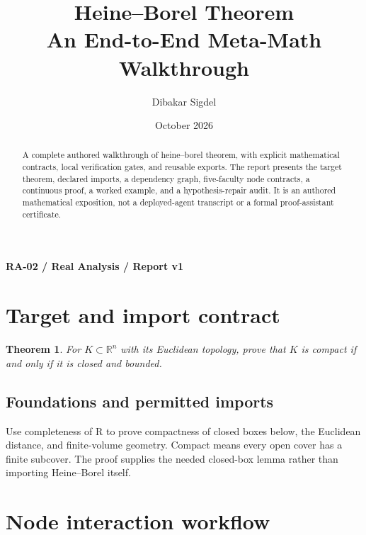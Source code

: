 \documentclass[preprint,12pt,aps,pra,showkeys,amsmath,amssymb,superscriptaddress,floatfix]{revtex4-2}
\newtheorem{theorem}{Theorem}[section]
\theoremstyle{definition}
\theoremstyle{remark}
\begin{document}
\title{Heine--Borel Theorem\\[4pt]\large An End-to-End Meta-Math Walkthrough}

\author{Dibakar Sigdel}


\date{October 2026}

\begin{abstract}

A complete authored walkthrough of heine--borel theorem, with explicit
mathematical contracts, local verification gates, and reusable exports.
The report presents the target theorem, declared imports, a dependency
graph, five-faculty node contracts, a continuous proof, a worked
example, and a hypothesis-repair audit. It is an authored mathematical
exposition, not a deployed-agent transcript or a formal proof-assistant
certificate.

\end{abstract}\maketitle\linespread{1.12}\selectfont

\noindent\textbf{RA-02 / Real Analysis / Report v1}

\section{Target and import contract}

\begin{theorem}

For \(K\subset\mathbb R^n\) with its Euclidean topology, prove that
\(K\) is compact if and only if it is closed and bounded.

\end{theorem}

\subsection{Foundations and permitted imports}

Use completeness of R to prove compactness of closed boxes below, the
Euclidean distance, and finite-volume geometry. Compact means every open
cover has a finite subcover. The proof supplies the needed closed-box
lemma rather than importing Heine--Borel itself.

\clearpage\section{Node interaction workflow}
\end{document}
